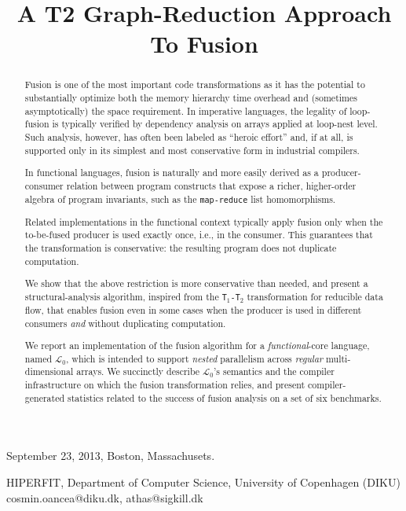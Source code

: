 \documentclass{sigplanconf}  %
\newcommand{\LO}{$\mathcal{L}_0$}
\newcommand{\comment}[2]{\textcolor{red}{\scriptsize \textsf \textbf{#1:}{#2}}}
\begin{document}
 {September 23, 2013, Boston, Massachusets.}


\title{A T2 Graph-Reduction Approach To Fusion}


           {HIPERFIT, Department of Computer Science, University of Copenhagen (DIKU)}
           {cosmin.oancea@diku.dk, athas@sigkill.dk}



\maketitle



\begin{abstract}

Fusion is one of the most important code transformations as it 
has the potential to substantially optimize both the memory hierarchy 
time overhead and (sometimes asymptotically) the space requirement.
%
In imperative languages, the legality of loop-fusion is typically 
verified by dependency analysis on arrays applied at loop-nest level.
Such analysis, however, has often been labeled as ``heroic effort''
and, if at all, is supported only in its simplest and most
conservative form in industrial compilers.  

In functional languages, fusion is naturally and more easily derived
as a producer-consumer relation between program constructs that expose
a richer, higher-order algebra of program invariants, 
such as the {\tt map-reduce} list homomorphisms. %

Related implementations in the functional context typically 
apply fusion only when the to-be-fused producer is used exactly once,
i.e., in the consumer.   This guarantees that the transformation is
conservative: the resulting program does not duplicate computation.

We show that the above restriction is more conservative than needed,
and present a structural-analysis algorithm, inspired
from the {\tt T$_1$-T$_2$} transformation for reducible data flow,
that enables fusion even in some cases when the producer is used 
in different consumers {\em and} without duplicating computation.  

We report an implementation of the fusion algorithm for a 
{\em functional}-core language, named \LO{}, which is intended 
to support {\em nested} parallelism across {\em regular} 
multi-dimensional arrays.  We succinctly describe \LO's
semantics and the compiler infrastructure on which the fusion
transformation relies, and present compiler-generated 
statistics related to the success of fusion analysis on a set 
of six benchmarks. 

\end{abstract}
\end{document}
